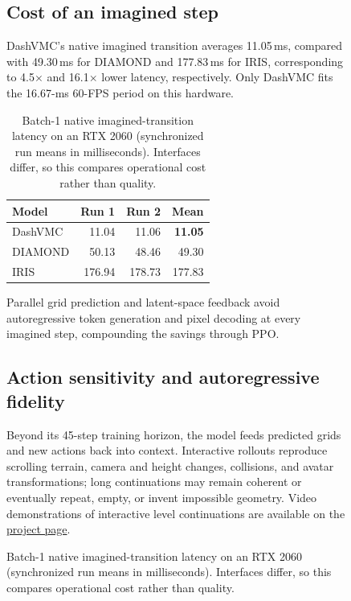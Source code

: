 \begin{figure}[!htbp]
\FloatBarrier
\subsection{Cost of an imagined step}
\label{sec:transition-latency}

DashVMC's native imagined transition averages 11.05\,ms, compared with 49.30\,ms for DIAMOND and 177.83\,ms for IRIS, corresponding to 4.5$\times$ and 16.1$\times$ lower latency, respectively.
Only DashVMC fits the 16.67-ms 60-FPS period on this hardware.

\begin{table}[H]
  \centering
  \footnotesize
  \setlength{\tabcolsep}{4pt}
  \caption{Batch-1 native imagined-transition latency on an RTX 2060 (synchronized run means in milliseconds). Interfaces differ, so this compares operational cost rather than quality.}
  \label{tab:transition-latency}
  \begin{tabular}{lrrr}
    \toprule
    Model & Run 1 & Run 2 & Mean \\
    \midrule
    DashVMC & 11.04 & 11.06 & \textbf{11.05} \\
    DIAMOND & 50.13 & 48.46 & 49.30 \\
    IRIS & 176.94 & 178.73 & 177.83 \\
    \bottomrule
  \end{tabular}
\end{table}

Parallel grid prediction and latent-space feedback avoid autoregressive token generation and pixel decoding at every imagined step, compounding the savings through PPO.

\FloatBarrier
\subsection{Action sensitivity and autoregressive fidelity}
\label{sec:continuations}

Beyond its 45-step training horizon, the model feeds predicted grids and new actions back into context.
Interactive rollouts reproduce scrolling terrain, camera and height changes, collisions, and avatar transformations; long continuations may remain coherent or eventually repeat, empty, or invent impossible geometry.
\ifdashvmcsubmission\else
  Video demonstrations of interactive level continuations are available on the \href{https://tariolle.github.io/dash-vmc/\#dreams}{project page}.
\fi


\end{figure}
